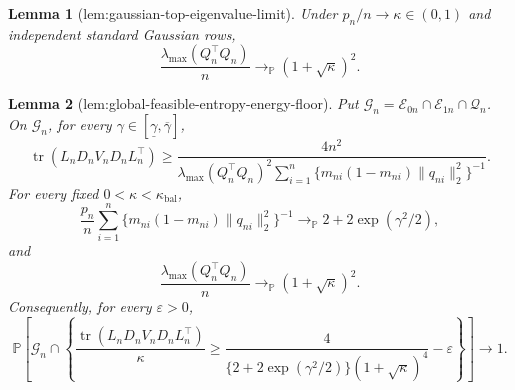 \documentclass{article}
\newtheorem{lemma}{Lemma}
\begin{document}
\begin{lemma}[lem:gaussian-top-eigenvalue-limit]\label{lem:gaussian-top-eigenvalue-limit}
Under \(p_n/n\to\kappa\in(0,1)\) and independent standard Gaussian rows,
\[
 \frac{\lambda_{\max}(Q_n^\top Q_n)}n
 \longrightarrow_{\mathbb P}(1+\sqrt\kappa)^2.
\]
\end{lemma}

\begin{lemma}[lem:global-feasible-entropy-energy-floor]\label{lem:global-feasible-entropy-energy-floor}
Put \(\mathcal G_n=\mathcal E_{0n}\cap\mathcal E_{1n}\cap\mathcal Q_n\).  On \(\mathcal G_n\), for every \(\gamma\in[\underline\gamma,\overline\gamma]\),
\[
 \operatorname{tr}(L_nD_nV_nD_nL_n^\top)
 \ge
 \frac{4n^2}
 {\lambda_{\max}(Q_n^\top Q_n)^2
  \displaystyle\sum_{i=1}^n
  \{m_{ni}(1-m_{ni})\|q_{ni}\|_2^2\}^{-1}}.
\]
For every fixed \(0<\kappa<\kappa_{\mathrm{bal}}\),
\[
 \frac{p_n}{n}\sum_{i=1}^n
 \{m_{ni}(1-m_{ni})\|q_{ni}\|_2^2\}^{-1}
 \longrightarrow_{\mathbb P}2+2\exp(\gamma^2/2),
\]
and
\[
 \frac{\lambda_{\max}(Q_n^\top Q_n)}n
 \longrightarrow_{\mathbb P}(1+\sqrt\kappa)^2.
\]
Consequently, for every \(\varepsilon>0\),
\[
 \mathbb P\!\left[
 \mathcal G_n\cap
 \left\{
 \frac{\operatorname{tr}(L_nD_nV_nD_nL_n^\top)}\kappa
 \ge
 \frac4{\{2+2\exp(\gamma^2/2)\}(1+\sqrt\kappa)^4}-\varepsilon
 \right\}
 \right]\longrightarrow1.
\]
\end{lemma}
\end{document}

